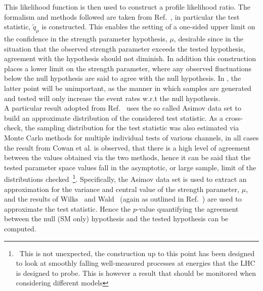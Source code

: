 \documentclass[floatfix]{article}
\begin{document}
This likelihood function is then used to construct a profile likelihood ratio. The formalism and methods followed are taken from 
Ref.~\cite{Cowan:2010js}, in particular the test statistic, $\tilde{q}_{\mu}$ is constructed. This enables the setting of a one-sided upper limit on the confidence 
in the strength parameter hypothesis, $\mu$, desirable since in the situation that the observed strength parameter exceeds the tested hypothesis, agreement with 
the hypothesis should not diminish. In addition this construction places a lower limit on the strength parameter, where any observed fluctuations below the null 
hypothesis are said to agree with the null hypothesis. In \Contur, the latter point will be unimportant, as the manner in which samples are 
generated and tested will only increase the event rates w.r.t the null hypothesis. 
\\

A particular result adopted from Ref.~\cite{Cowan:2010js} uses the so called Asimov data set to build an approximate distribution of the considered test statistic. 
As a cross-check, the sampling distribution for the test statistic was also estimated via Monte Carlo methods for multiple individual tests of various channels, 
in all cases the result from Cowan et al. is observed, that there is a high level of agreement between the values obtained via the two methods, hence it can be said
that the tested parameter space values fall in the asymptotic, or large sample, limit of the distributions checked~\footnote{~This is not unexpected, the
construction up to this point has been designed to look at smoothly falling well-measured processes at energies that the LHC is designed to probe. This is however a 
result that should be monitored when considering different models}. Specifically, the Asimov data set is used to extract an approximation for the variance and central value of the strength parameter, $\mu$, and the results of Wilks~\cite{Wilks:1938dza} and Wald~\cite{Wald:1943:EWM} (again as outlined in Ref.~\cite{Cowan:2010js}) are used to approximate the test statistic. 
Hence the $p$-value quantifying the agreement between the null (SM only) hypothesis and the tested hypothesis can be computed. 
\\
\end{document}
